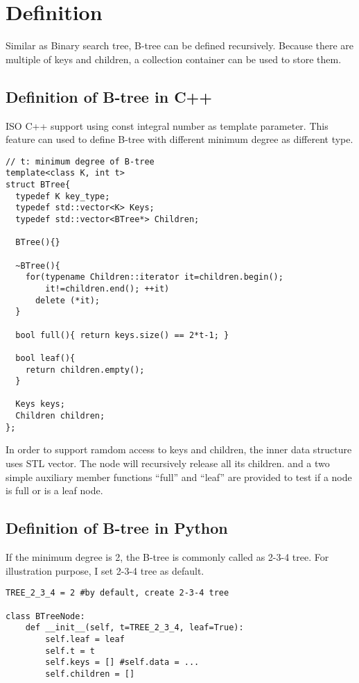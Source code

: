 \documentclass{article}
\begin{document}
\section{Definition}
\label{btree-definition}

Similar as Binary search tree, B-tree can be defined recursively.
Because there are multiple of keys and children, a collection container
can be used to store them.

\subsection*{Definition of B-tree in C++}
ISO C++ support using const integral number as template parameter.
This feature can used to define B-tree with different minimum degree
as different type.

\lstset{language=C++}
\begin{lstlisting}
// t: minimum degree of B-tree
template<class K, int t>
struct BTree{
  typedef K key_type;
  typedef std::vector<K> Keys;
  typedef std::vector<BTree*> Children;

  BTree(){}

  ~BTree(){
    for(typename Children::iterator it=children.begin();
        it!=children.end(); ++it)
      delete (*it);
  }

  bool full(){ return keys.size() == 2*t-1; }

  bool leaf(){
    return children.empty();
  }

  Keys keys;
  Children children; 
};
\end{lstlisting}

In order to support ramdom access to keys and children, the
inner data structure uses STL vector. The node will recursively
release all its children. and a two simple auxiliary member
functions ``full'' and ``leaf'' are provided to test if a node
is full or is a leaf node.

\subsection*{Definition of B-tree in Python}

If the minimum degree is 2, the B-tree is commonly called as 2-3-4 tree.
For illustration purpose, I set 2-3-4 tree as default.

\lstset{language=Python}
\begin{lstlisting}
TREE_2_3_4 = 2 #by default, create 2-3-4 tree

class BTreeNode:
    def __init__(self, t=TREE_2_3_4, leaf=True):
        self.leaf = leaf
        self.t = t
        self.keys = [] #self.data = ...
        self.children = []
\end{lstlisting}
\end{document}
